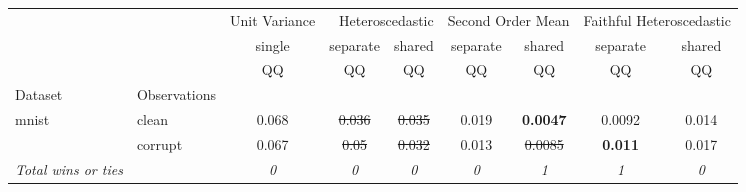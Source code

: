 \begin{tabular}{ll|c|cc|cc|cc}
\toprule
{} & {} & {Unit Variance} & \multicolumn{2}{r}{Heteroscedastic} & \multicolumn{2}{r}{Second Order Mean} & \multicolumn{2}{r}{Faithful Heteroscedastic} \\
{} & {} & {single} & {separate} & {shared} & {separate} & {shared} & {separate} & {shared} \\
{} & {} & {QQ} & {QQ} & {QQ} & {QQ} & {QQ} & {QQ} & {QQ} \\
{Dataset} & {Observations} & {} & {} & {} & {} & {} & {} & {} \\
\midrule
\multirow[t]{2}{*}{mnist} & clean & 0.068 & \sout{0.036} & \sout{0.035} & 0.019 & \textbf{0.0047} & 0.0092 & 0.014 \\
 & corrupt & 0.067 & \sout{0.05} & \sout{0.032} & 0.013 & \sout{0.0085} & \textbf{0.011} & 0.017 \\
\textit{{Total wins or ties}} &  & \textit{0} & \textit{0} & \textit{0} & \textit{0} & \textit{1} & \textit{1} & \textit{0} \\
\bottomrule
\end{tabular}
